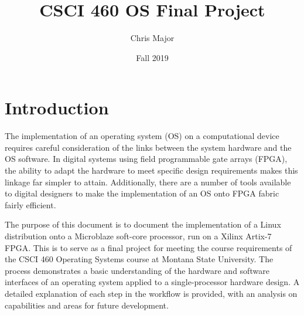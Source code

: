 \documentclass{article}
\title{CSCI 460 OS Final Project}
\author{Chris Major}
\date{Fall 2019}
\begin{document}
\maketitle

\section{Introduction}
The implementation of an operating system (OS) on a computational device requires careful consideration of the links between the system hardware and the OS software. In digital systems using field programmable gate arrays (FPGA), the ability to adapt the hardware to meet specific design requirements makes this linkage far simpler to attain. Additionally, there are a number of tools available to digital designers to make the implementation of an OS onto FPGA fabric fairly efficient.\par
The purpose of this document is to document the implementation of a Linux distribution onto a Microblaze soft-core processor, run on a Xilinx Artix-7 FPGA. This is to serve as a final project for meeting the course requirements of the CSCI 460 Operating Systems course at Montana State University. The process demonstrates a basic understanding of the hardware and software interfaces of an operating system applied to a single-processor hardware design. A detailed explanation of each step in the workflow is provided, with an analysis on capabilities and areas for future development.\par

\end{document}
